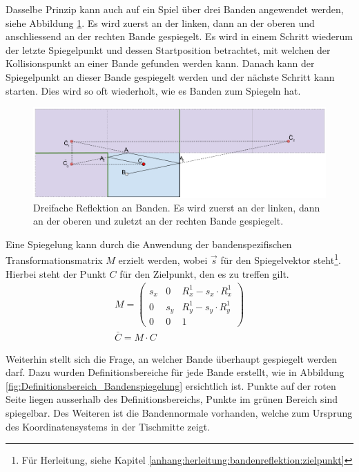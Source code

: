 Dasselbe Prinzip kann auch auf ein Spiel über drei Banden angewendet werden, siehe Abbildung \ref{fig:Dreifache Reflektion an Banden}.
Es wird zuerst an der linken, dann an der oberen und anschliessend an der rechten Bande gespiegelt.
Es wird in einem Schritt wiederum der letzte Spiegelpunkt und dessen Startposition betrachtet, mit welchen der Kollisionspunkt
an einer Bande gefunden werden kann. Danach kann der Spiegelpunkt an dieser Bande gespiegelt werden und der nächste
Schritt kann starten. Dies wird so oft wiederholt, wie es Banden zum Spiegeln hat.
\begin{figure}[h]
    \begin{center}
        \includegraphics[width=1\linewidth]{../common/03_billiard_ai/resources/54_rail_reflection_3.png}
    \end{center}
    \caption{Dreifache Reflektion an Banden. Es wird zuerst an der linken, dann an der oberen und zuletzt an der rechten Bande gespiegelt.}
    \label{fig:Dreifache Reflektion an Banden}
\end{figure}

Eine Spiegelung kann durch die Anwendung der bandenspezifischen Transformationsmatrix $M$ erzielt werden, wobei $\vec{s}$
für den Spiegelvektor steht\footnote{Für Herleitung, siehe Kapitel \ref{anhang:herleitung:bandenreflektion:zielpunkt}}.
Hierbei steht der Punkt $C$ für den Zielpunkt, den es zu treffen gilt.
\begin{align}
    M = \begin{pmatrix}s_x & 0 & R^1_x - s_x \cdot R^1_x \\ 0 & s_y & R^1_y - s_y \cdot R^1_y \\ 0 & 0 & 1\end{pmatrix}\\
    \bar{C} = M \cdot C
\end{align}

Weiterhin stellt sich die Frage, an welcher Bande überhaupt gespiegelt werden darf.
Dazu wurden Definitionsbereiche für jede Bande erstellt, wie in Abbildung \ref{fig:Definitionsbereich_Bandenspiegelung} ersichtlich ist.
Punkte auf der roten Seite liegen ausserhalb des Definitionsbereichs, Punkte im grünen Bereich sind spiegelbar.
Des Weiteren ist die Bandennormale vorhanden, welche zum Ursprung des Koordinatensystems in der Tischmitte zeigt.

